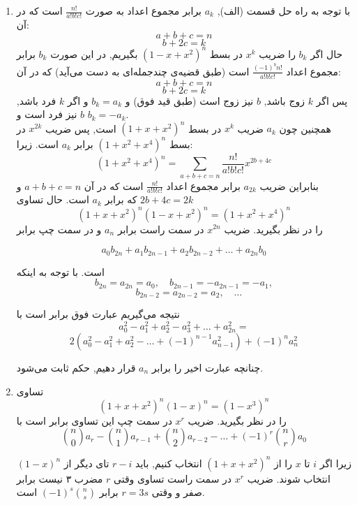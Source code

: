 \begin{enumerate}
	\item
    	با توجه به راه حل قسمت (الف), $a_k$ برابر مجموع اعداد به صورت $\frac{n!}{a!b!c!}$ است که در آن:
    	$$a + b + c = n$$ 
    	$$b + 2c = k$$
    	 حال اگر $b_k$ را ضریب $x^k$ در بسط $(1 - x + x^2)^n$ بگیریم, در این صورت $b_k$ برابر مجموع اعداد $\frac{(-1)^bn!}{a!b!c!}$ است (طبق قضیه‌ی چندجمله‌ای  به دست می‌آید) که در آن:
    	 $$a + b + c =  n$$ 
    	 $$b + 2c = k$$
    	 پس اگر $k$ زوج باشد, $b$ نیز زوج است (طبق قید فوق) و $b_k = a_k$ و اگر $k$ فرد باشد, $b$ نیز فرد است و $b_k = -a_k$.
    	 \\
         همچنین چون $a_k$ ضریب $x^k$ در بسط $(1 + x + x^2)^n$ است, پس ضریب $x^{2k}$ در بسط $(1 + x^2 + x^4)^n$ برابر $a_k$ است. زیرا:
         $$(1+x^2+x^4)^n=\sum_{a+b+c=n} \frac{n!}{a!b!c!} x^{2b+4c}$$
         بنابراین ضریب $a_{2k}$ برابر مجموع اعداد $\frac{n!}{a!b!c!}$ است که در آن $a+b+c=n$ و $2b+4c=2k$ که برابر $a_k$ است. حال تساوی
        $$(1 + x + x^2)^n(1 - x + x^2)^n = (1 + x^2 + x^4)^n$$
        را در نظر بگیرید. ضریب $x^{2n}$ در سمت راست برابر $a_n$ و در سمت چپ برابر
        
        $$a_0b_{2n} + a_1b_{2n - 1} + a_2b_{2n - 2} + \dots + a_{2n}b_0$$
        
        است. با توجه به اینکه
        $$b_{2n} = a_{2n} = a_0,\quad b_{2n - 1} = -a_{2n - 1} = -a_1,$$
        $$\quad b_{2n - 2} = a_{2n - 2} = a_2,\quad \dots$$
    	
        نتیجه می‌گیریم عبارت فوق برابر است با
        $$a_0^2 - a_1^2 + a_2^2 - a_3^2 + \dots + a_{2n}^2 = $$
        $$2(a_0^2 - a_1^2 + a_2^2 - \dots + (-1)^{n - 1}a_{n - 1}^2) + (-1)^n a_n^2$$
    	
        چنانچه عبارت اخیر را برابر $a_n$ قرار دهیم, حکم ثابت می‌شود.
        
	\item
    	تساوی
    	$$(1 + x + x^2)^n(1 - x)^n = (1 - x^3)^n$$
        را در نظر بگیرید. ضریب $x^r$ در سمت چپ این تساوی برابر است با
    	$${n \choose 0}a_r - {n \choose 1}a_{r - 1} + {n \choose 2}a_{r - 2} - \dots + (-1)^r{n \choose r}a_0$$
    	
        زیرا اگر $i$ تا $x$ را از $(1+x+x^2)^n$ انتخاب کنیم, باید $r-i$ تای دیگر از $(1-x)^n$ انتخاب شوند. ضریب $x^r$ در سمت راست تساوی وقتی $r$ مضرب ۳ نیست برابر صفر و وقتی $r = 3s$ برابر $(-1)^s{n \choose s}$ است.
	\end{enumerate}
